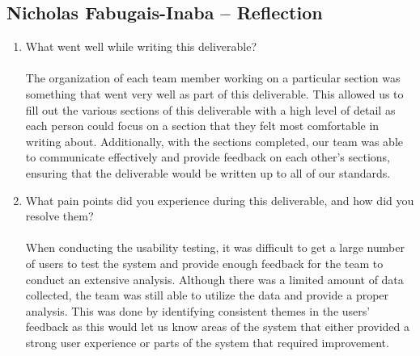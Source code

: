 \documentclass[12pt, titlepage]{article}
\begin{document}
\begin{enumerate}
\end{enumerate}

\subsection*{Nicholas Fabugais-Inaba -- Reflection}

\begin{enumerate}
  \item What went well while writing this deliverable?\\\\
  The organization of each team member working on a particular section was something that went
  very well as part of this deliverable. This allowed us to fill out the various sections of this
  deliverable with a high level of detail as each person could focus on a section that they felt most
  comfortable in writing about. Additionally, with the sections completed, our team was able to communicate
  effectively and provide feedback on each other's sections, ensuring that the deliverable
  would be written up to all of our standards.
  \item What pain points did you experience during this deliverable, and how
  did you resolve them?\\\\
  When conducting the usability testing, it was difficult to get a large number of users to test the
  system and provide enough feedback for the team to conduct an extensive analysis. Although there
  was a limited amount of data collected, the team was still able to utilize the data and provide
  a proper analysis. This was done by identifying consistent themes in the users' feedback as this
  would let us know areas of the system that either provided a strong user experience or parts of
  the system that required improvement.
\end{enumerate}
\end{document}
